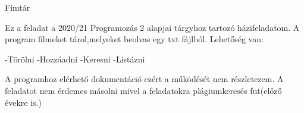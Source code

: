 Fimtár

Ez a feladat a 2020/21 Programozás 2 alapjai tárgyhoz tartozó házifeladatom. A program filmeket tárol,melyeket beolvas egy txt fájlból. Lehetőség van\+:

-\/Törölni -\/Hozzáadni -\/Keresni -\/Listázni

A programhoz elérhető dokumentáció ezért a működését nem részletezem. A feladatot nem érdemes másolni mivel a feladatokra plágiumkeresés fut(előző évekre is.) 